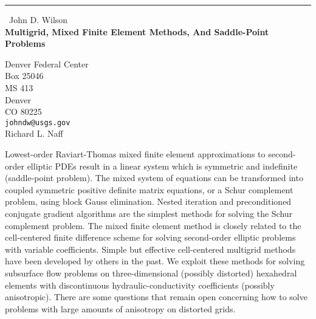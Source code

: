 \documentclass{report}
\begin{document}
\begin{center}
\rule{6in}{1pt} \
{\large John D. Wilson \\
{\bf Multigrid, Mixed Finite Element Methods, And Saddle-Point Problems}}

Denver Federal Center \\ Box 25046 \\ MS 413 \\ Denver \\ CO 80225
\\
{\tt johndw@usgs.gov}\\
Richard L. Naff\end{center}

Lowest-order Raviart-Thomas mixed finite element approximations to
second-order elliptic PDEs result in a linear system which is symmetric
and indefinite (saddle-point problem). The mixed system of equations can
be transformed into coupled symmetric positive definite matrix equations,
or a Schur complement problem, using block Gauss elimination. Nested
iteration and preconditioned conjugate gradient algorithms are the
simplest methods for solving the Schur complement problem. The mixed
finite element method is closely related to the cell-centered finite
difference scheme for solving second-order elliptic problems with
variable coefficients.
Simple but effective cell-centered multigrid methods have
been developed by others in the past. We exploit these methods
for solving subsurface flow problems on three-dimensional
(possibly distorted) hexahedral elements with discontinuous
hydraulic-conductivity coefficients (possibly anisotropic).
There are some questions that remain open concerning
how to solve problems with large amounts of anisotropy on distorted grids.
\end{document}
